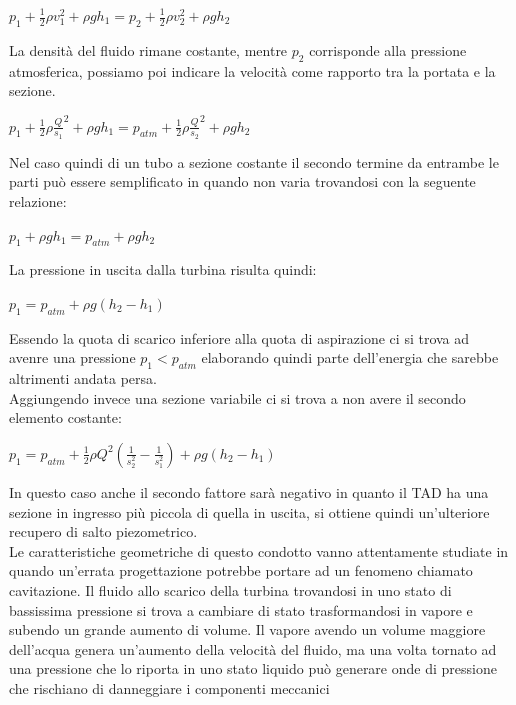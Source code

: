 \begin{center}
    \large{$p_1+\frac{1}{2}\rho v_1^2 + \rho g h_1 = p_2+\frac{1}{2}\rho v_2^2 + \rho g h_2$}
\end{center}
La densità del fluido rimane costante, mentre \large{$p_2$} corrisponde alla pressione atmosferica, possiamo poi indicare la velocità come rapporto tra la portata e la sezione.
\begin{center}
    \large{$p_1+\frac{1}{2}\rho \frac{Q}{s_1}^2 + \rho g h_1 = p_{atm}+\frac{1}{2}\rho \frac{Q}{s_2}^2 + \rho g h_2$}
\end{center}
Nel caso quindi di un tubo a sezione costante il secondo termine da entrambe le parti può essere semplificato in quando non varia trovandosi con la seguente relazione:
\begin{center}
    \large{$p_1 + \rho g h_1 = p_{atm}+ \rho g h_2$}
\end{center}
La pressione in uscita dalla turbina risulta quindi:
\begin{center}
    \large{$p_1 = p_{atm} + \rho g (h_2 - h_1)$}
\end{center}
Essendo la quota di scarico inferiore alla quota di aspirazione ci si trova ad avenre una pressione \large{$p_1<p_{atm}$} elaborando quindi parte dell'energia che sarebbe altrimenti andata persa.\\
Aggiungendo invece una sezione variabile ci si trova a non avere il secondo elemento costante:
\begin{center}
    \large{$p_1 = p_{atm} + \frac{1}{2}\rho Q^2 (\frac{1}{s_2^2} - \frac{1}{s_1^2}) + \rho g (h_2 - h_1)$}
\end{center}
In questo caso anche il secondo fattore sarà negativo in quanto il TAD ha una sezione in ingresso più piccola di quella in uscita, si ottiene quindi un'ulteriore recupero di salto piezometrico.\\
Le caratteristiche geometriche di questo condotto vanno attentamente studiate in quando un'errata progettazione potrebbe portare ad un fenomeno chiamato cavitazione.
Il fluido allo scarico della turbina trovandosi in uno stato di bassissima pressione si trova a cambiare di stato trasformandosi in vapore e subendo un grande aumento di volume.
Il vapore avendo un volume maggiore dell'acqua genera un'aumento della velocità del fluido, ma una volta tornato ad una pressione che lo riporta in uno stato liquido può generare onde di pressione che rischiano di danneggiare i componenti meccanici
\vfill
